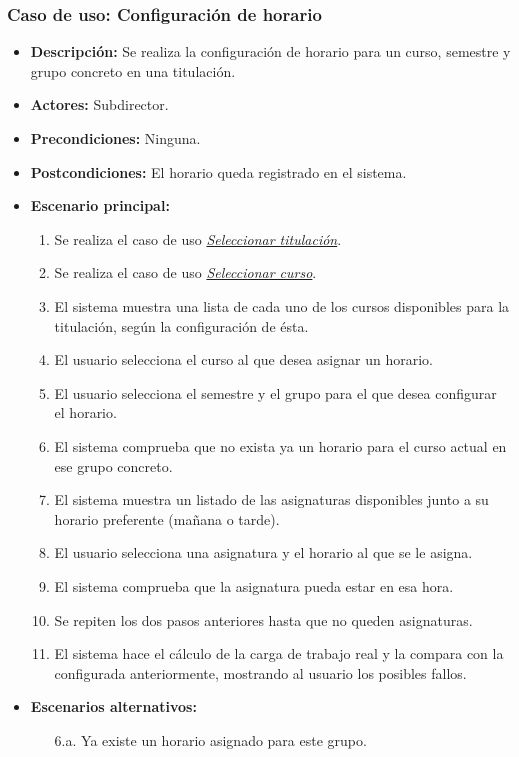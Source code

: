 \documentclass{book}
\begin{document}
\subsubsection*{Caso de uso: Configuración de horario}
\begin{itemize}
\item{\bf Descripción:} Se realiza la configuración de horario para un curso, semestre y grupo concreto en una titulación.
\item{\bf Actores:} Subdirector.
\item{\bf Precondiciones:} Ninguna.
\item{\bf Postcondiciones:} El horario queda registrado en el sistema.
\item{\bf Escenario principal:}
	\begin{enumerate}
	\item Se realiza el caso de uso {\em \hyperref[select_titulacion]{Seleccionar titulación}}.
	\item Se realiza el caso de uso {\em \hyperref[select_curso]{Seleccionar curso}}.
	\item El sistema muestra una lista de cada uno de los cursos disponibles para la titulación, según la configuración de ésta.
	\item El usuario selecciona el curso al que desea asignar un horario.
	\item El usuario selecciona el semestre y el grupo para el que desea configurar el horario.
	\item El sistema comprueba que no exista ya un horario para el curso actual en ese grupo concreto.
	\item El sistema muestra un listado de las asignaturas disponibles junto a su horario preferente (mañana o tarde).
	\item El usuario selecciona una asignatura y el horario al que se le asigna.
	\item El sistema comprueba que la asignatura pueda estar en esa hora.
	\item Se repiten los dos pasos anteriores hasta que no queden asignaturas.
	\item El sistema hace el cálculo de la carga de trabajo real y la compara con la configurada anteriormente, mostrando al usuario los posibles fallos.
	\end{enumerate}
\item{\bf Escenarios alternativos:}
	\begin{itemize}
		\item[6.a.] Ya existe un horario asignado para este grupo.

\end{itemize}
\end{itemize}
\end{document}
